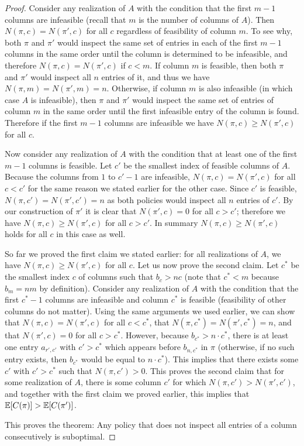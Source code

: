 \begin{proof}
 Consider any realization of $A$ with the condition that the first $m-1$ columns are infeasible (recall that $m$ is the number of columns of $A$).
 Then $N(\pi, c) = N(\pi', c)$ for all $c$ regardless of feasibility of column $m$.
 To see why, both $\pi$ and $\pi'$ would inspect the same set of entries in each of the first $m-1$ columns in the same order until the column is determined to be infeasible, and therefore $N(\pi, c) = N(\pi', c)$ if $c<m$.
 If column $m$ is feasible, then both $\pi$ and $\pi'$ would inspect all $n$ entries of it, and thus we have $N(\pi, m) = N(\pi', m) = n$. Otherwise, if column $m$ is also infeasible (in which case $A$ is infeasible), then $\pi$ and $\pi'$ would inspect the same set of entries of column $m$ in the same order until the first infeasible entry of the column is found. Therefore if the first $m-1$ columns are infeasible we have $N(\pi, c) \geq N(\pi', c)$ for all $c$.

 Now consider any realization of $A$ with the condition that at least one of the first $m-1$ columns is feasible. Let $c'$ be the smallest index of feasible columns of $A$.
 Because the columns from $1$ to $c'-1$ are infeasible, $N(\pi, c) = N(\pi', c)$ for all $c < c'$ for the same reason we stated earlier for the other case. 
 Since $c'$ is feasible, $N(\pi, c') = N(\pi', c') = n$ as both policies would inspect all $n$ entries of $c'$. By our construction of $\pi'$ it is clear that $N(\pi', c) = 0$ for all $c > c'$; therefore we have $N(\pi, c) \geq N(\pi', c)$ for all $c>c'$. In summary $N(\pi, c) \geq N(\pi', c)$ holds for all $c$ in this case as well. 

 So far we proved the first claim we stated earlier: for all realizations of $A$, we have $N(\pi, c) \geq N(\pi', c)$ for all $c$.
 Let us now prove the second claim. Let $c^*$ be the smallest index $c$ of columns such that $b_c > nc$ (note that $c^* < m$ because $b_m = nm$ by definition). 
 Consider any realization of $A$ with the condition that the first $c^*-1$ columns are infeasible and column $c^*$ is feasible (feasibility of other columns do not matter). 
 Using the same arguments we used earlier, we can show that $N(\pi, c) = N(\pi', c)$ for all $c < c^*$, that $N(\pi, c^*) = N(\pi', c^*) = n$, and that $N(\pi', c) = 0$ for all $c> c^*$. 
 However, because $b_{c^*} > n \cdot c^*$, there is at least one entry $a_{r',c'}$ with $c' > c^*$ which  appears before $b_{n, c^*}$ in $\pi$ (otherwise, if no such entry exists, then $b_{c^*}$ would be equal to $n \cdot c^*$). This implies that there exists some $c'$ with $c' > c^*$ such that $N(\pi, c') > 0$. 
 This proves the second claim that for some realization of $A$, there is some column $c'$ for which $N(\pi, c') >  N(\pi', c')$, and together with the first claim we proved earlier, this implies that $\mathbb{E}[C(\pi)] > \mathbb{E}[C(\pi')]$. 

 This proves the theorem: Any policy that does not inspect all entries of a column consecutively is suboptimal.
 \end{proof}

